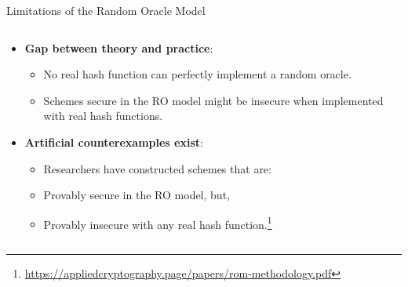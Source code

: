 \documentclass[aspectratio=169, lualatex, handout]{beamer}
\begin{document}
\begin{frame}{Limitations of the Random Oracle Model}
	\begin{columns}
		\begin{column}{1\textwidth}
			\begin{itemize}[<+->]
				\item \textbf{Gap between theory and practice}:
				      \begin{itemize}
					      \item No real hash function can perfectly implement a random oracle.
					      \item Schemes secure in the RO model might be insecure when implemented with real hash functions.
				      \end{itemize}
				\item \textbf{Artificial counterexamples exist}:
				      \begin{itemize}
					      \item Researchers have constructed schemes that are:
					      \item Provably secure in the RO model, but,
					      \item Provably insecure with any real hash function.\footnote{\url{https://appliedcryptography.page/papers/rom-methodology.pdf}}
				      \end{itemize}
			\end{itemize}
		\end{column}
	\end{columns}
\end{frame}

\begin{frame}[plain]
	\titlepage
\end{frame}
\end{document}
